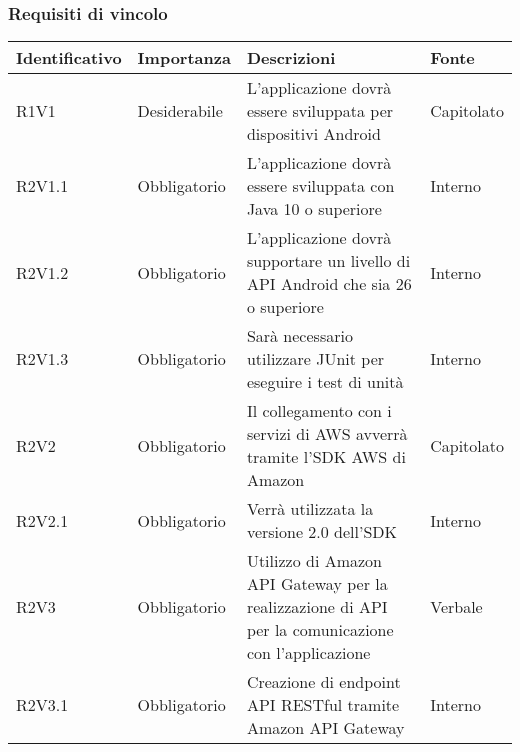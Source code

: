 \subsubsection{Requisiti di vincolo}
\begin{center}
	\renewcommand{\arraystretch}{1.5}
	\begin{longtable}{  >{\RaggedRight}p{2.5cm}  
						>{\RaggedRight}p{2.1cm} 
						>{\RaggedRight}p{7cm}  
						>{\RaggedRight}p{1.7cm} 
						}
		\rowcolor{tableHeadYellow}

		\textbf{Identificativo}   & \textbf{Importanza} & \textbf{Descrizioni} & \textbf{Fonte} \\ 
		\endhead

		R1V1   & Desiderabile & L'applicazione dovrà essere sviluppata per dispositivi Android                                                                             & Capitolato            \\  
		R2V1.1 & Obbligatorio & L'applicazione dovrà essere sviluppata con Java 10 o superiore                                                                             & Interno               \\  
		R2V1.2 & Obbligatorio & L'applicazione dovrà supportare un livello di API Android che sia 26 o superiore                                                           & Interno               \\  
		R2V1.3 & Obbligatorio & Sarà necessario utilizzare JUnit per eseguire i test di unità                                                                              & Interno               \\  
		R2V2   & Obbligatorio & Il collegamento con i servizi di AWS avverrà tramite l'SDK AWS  di Amazon                                                                  & Capitolato            \\  
		R2V2.1 & Obbligatorio & Verrà utilizzata la versione 2.0 dell'SDK                                                                                                  & Interno               \\  
		R2V3   & Obbligatorio & Utilizzo di Amazon API Gateway per la realizzazione di API per la comunicazione con l'applicazione                                         & Verbale               \\  
		R2V3.1 & Obbligatorio & Creazione di endpoint API RESTful tramite Amazon API Gateway                                                                               & Interno               \\  

\end{longtable}
\end{center}
